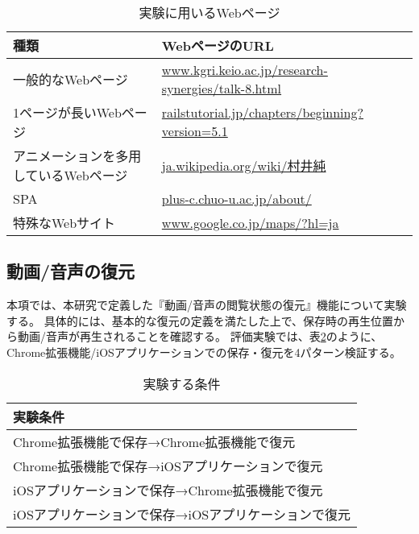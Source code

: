 \begin{table}[htbp]
  \label{tb:evl-basic-web-contents}
  \caption{実験に用いるWebページ}
  \begin{center}
    \begin{tabular}{|l|l|}
    \hline
    種類 & WebページのURL  \\ \hline
    一般的なWebページ & \url{www.kgri.keio.ac.jp/research-synergies/talk-8.html} \\ \hline
    1ページが長いWebページ & \url{railstutorial.jp/chapters/beginning?version=5.1} \\ \hline
    アニメーションを多用しているWebページ & \url{ja.wikipedia.org/wiki/村井純} \\ \hline
    SPA & \url{plus-c.chuo-u.ac.jp/about/} \\ \hline
    特殊なWebサイト & \url{www.google.co.jp/maps/?hl=ja} \\ \hline
    \end{tabular}
  \end{center}
\end{table}

\subsection{動画/音声の復元}
本項では、本研究で定義した『動画/音声の閲覧状態の復元』機能について実験する。
具体的には、基本的な復元の定義を満たした上で、保存時の再生位置から動画/音声が再生されることを確認する。
評価実験では、表\ref{tb:evl-video-audio-conditions}のように、Chrome拡張機能/iOSアプリケーションでの保存・復元を4パターン検証する。

\begin{table}[htbp]
  \label{tb:evl-video-audio-conditions}
  \caption{実験する条件}
  \begin{center}
    \begin{tabular}{|l|}
    \hline
    実験条件  \\ \hline
    Chrome拡張機能で保存→Chrome拡張機能で復元 \\ \hline
    Chrome拡張機能で保存→iOSアプリケーションで復元 \\ \hline
    iOSアプリケーションで保存→Chrome拡張機能で復元 \\ \hline
    iOSアプリケーションで保存→iOSアプリケーションで復元 \\ \hline
    \end{tabular}
  \end{center}
\end{table}

